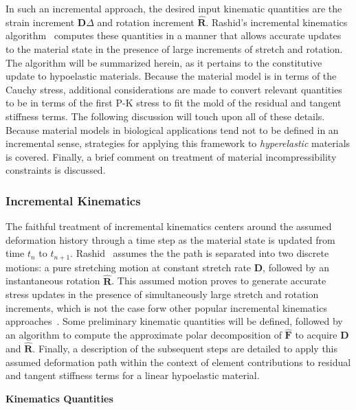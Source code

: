 In such an incremental approach, the desired input kinematic quantities are the strain increment $\bm{D}\Delta$ and rotation increment $\hat{\bm{R}}$. Rashid's incremental kinematics algorithm~\cite{rashid_1993} computes these quantities in a manner that allows accurate updates to the material state in the presence of large increments of stretch and rotation. The algorithm will be summarized herein, as it pertains to the constitutive update to hypoelastic materials. Because the material model is in terms of the Cauchy stress, additional considerations are made to convert relevant quantities to be in terms of the first P-K stress to fit the mold of the residual and tangent stiffness terms. The following discussion will touch upon all of these details. Because material models in biological applications tend not to be defined in an incremental sense, strategies for applying this framework to \textit{hyperelastic} materials is covered. Finally, a brief comment on treatment of material incompressibility constraints is discussed.

\subsubsection{Incremental Kinematics}

The faithful treatment of incremental kinematics centers around the assumed deformation history through a time step as the material state is updated from time $t_n$ to $t_{n+1}$. Rashid~\cite{rashid_1993} assumes the the path is separated into two discrete motions: a pure stretching motion at constant stretch rate $\bm{D}$, followed by an instantaneous rotation $\hat{\bm{R}}$. This assumed motion proves to generate accurate stress updates in the presence of simultaneously large stretch and rotation increments, which is not the case forw other popular incremental kinematics approaches~\cite{rashid_1996}. Some preliminary kinematic quantities will be defined, followed by an algorithm to compute the approximate polar decomposition of $\hat{\bm{F}}$ to acquire $\bm{D}$ and $\hat{\bm{R}}$. Finally, a description of the subsequent steps are detailed to apply this assumed deformation path within the context of element contributions to residual and tangent stiffness terms for a linear hypoelastic material.

\textbf{Kinematics Quantities}

